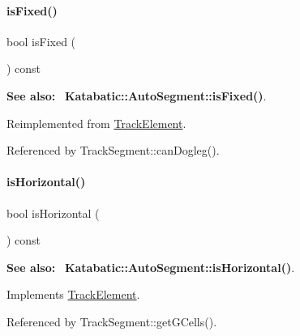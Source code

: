 \mbox{\label{classKite_1_1TrackSegment_afd7362b850709bed8b61c1aa22399f97}} 
\paragraph{\texorpdfstring{is\+Fixed()}{isFixed()}}
{\footnotesize\ttfamily bool is\+Fixed (\begin{DoxyParamCaption}{ }\end{DoxyParamCaption}) const\hspace{0.3cm}{\ttfamily [virtual]}}

{\bfseries See also\+:}~ \textbf{ Katabatic\+::\+Auto\+Segment\+::is\+Fixed()}. 

Reimplemented from \mbox{\hyperlink{classKite_1_1TrackElement_afd7362b850709bed8b61c1aa22399f97}{Track\+Element}}.



Referenced by Track\+Segment\+::can\+Dogleg().

\mbox{\label{classKite_1_1TrackSegment_a21b9cefd33ae22e4c2070ad441bdd30b}} 
\paragraph{\texorpdfstring{is\+Horizontal()}{isHorizontal()}}
{\footnotesize\ttfamily bool is\+Horizontal (\begin{DoxyParamCaption}{ }\end{DoxyParamCaption}) const\hspace{0.3cm}{\ttfamily [virtual]}}

{\bfseries See also\+:}~ \textbf{ Katabatic\+::\+Auto\+Segment\+::is\+Horizontal()}. 

Implements \mbox{\hyperlink{classKite_1_1TrackElement_a9d3db1f8a5aca58f8f54d291faebf873}{Track\+Element}}.



Referenced by Track\+Segment\+::get\+G\+Cells().

\mbox{\label{classKite_1_1TrackSegment_abd54544ef1710ee4b67cfb021d73446c}} 
